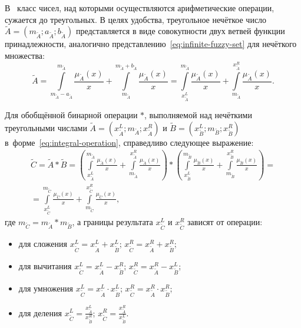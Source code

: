 В~\cite{Borisov_Krumberg_Riga} класс чисел, над которыми осуществляются арифметические операции, сужается до треугольных. В целях удобства, треугольное нечёткое число $\tilde{A}=\left( {{m}_{{\tilde{A}}}};{{a}_{{\tilde{A}}}};{{b}_{{\tilde{A}}}} \right)$ представляется в виде совокупности двух ветвей функции принадлежности, аналогично представлению~\eqref{eq:infinite-fuzzy-set} для нечёткого множества:
\begin{equation}
\label{eq:integral-operation}
	\tilde{A}=\int\limits_{{{m}_{{\tilde{A}}}}-{{a}_{{\tilde{A}}}}}^{{{m}_{{\tilde{A}}}}}{\frac{{{\mu }_{{\tilde{A}}}}\left( x \right)}{x}}+\int\limits_{{{m}_{{\tilde{A}}}}}^{{{m}_{{\tilde{A}}}}+{{b}_{{\tilde{A}}}}}{\frac{{{\mu }_{{\tilde{A}}}}\left( x \right)}{x}}=\int\limits_{x_{{\tilde{A}}}^{L}}^{{{m}_{{\tilde{A}}}}}{\frac{{{\mu }_{{\tilde{A}}}}\left( x \right)}{x}}+\int\limits_{{{m}_{{\tilde{A}}}}}^{x_{{\tilde{A}}}^{R}}{\frac{{{\mu }_{{\tilde{A}}}}\left( x \right)}{x}}.
\end{equation}

Для обобщённой бинарной операции $*$, выполняемой над нечёткими треугольными числами $\tilde{A}=\left( x_{{\tilde{A}}}^{L};{{m}_{{\tilde{A}}}};x_{{\tilde{A}}}^{R} \right)$ и $\tilde{B}=\left( x_{{\tilde{B}}}^{L};{{m}_{{\tilde{B}}}};x_{{\tilde{B}}}^{R} \right)$ в~форме~\eqref{eq:integral-operation}, справедливо следующее выражение:
\begin{gather*}
	\tilde{C}=\tilde{A}*\tilde{B}=\left( \int\limits_{x_{{\tilde{A}}}^{L}}^{{{m}_{{\tilde{A}}}}}{\frac{{{\mu }_{{\tilde{A}}}}\left( x \right)}{x}}+\int\limits_{{{m}_{{\tilde{A}}}}}^{x_{{\tilde{A}}}^{R}}{\frac{{{\mu }_{{\tilde{A}}}}\left( x \right)}{x}} \right)*\left( \int\limits_{x_{{\tilde{B}}}^{L}}^{{{m}_{{\tilde{B}}}}}{\frac{{{\mu }_{{\tilde{B}}}}\left( x \right)}{x}}+\int\limits_{{{m}_{{\tilde{B}}}}}^{x_{{\tilde{B}}}^{R}}{\frac{{{\mu }_{{\tilde{B}}}}\left( x \right)}{x}} \right)={}\\
	=\int\limits_{x_{{\tilde{C}}}^{L}}^{{{m}_{{\tilde{C}}}}}{\frac{{{\mu }_{{\tilde{C}}}}\left( x \right)}{x}}+\int\limits_{{{m}_{{\tilde{C}}}}}^{x_{{\tilde{C}}}^{R}}{\frac{{{\mu }_{{\tilde{C}}}}\left( x \right)}{x}},
\end{gather*}
где $m_{\tilde C}=m_{\tilde A}*m_{\tilde B}$, а границы результата $x_{\tilde C}^{L}$ и $x_{\tilde C}^{R}$ зависят от операции:
\begin{itemize}
	\item для сложения $x_{{\tilde{C}}}^{L}=x_{{\tilde{A}}}^{L}+x_{{\tilde{B}}}^{L}$; $x_{{\tilde{C}}}^{R}=x_{{\tilde{A}}}^{R}+x_{{\tilde{B}}}^{R}$;
	\item для вычитания $x_{{\tilde{C}}}^{L}=x_{{\tilde{A}}}^{L}-x_{{\tilde{B}}}^{R}$; $x_{{\tilde{C}}}^{R}=x_{{\tilde{A}}}^{R}-x_{{\tilde{B}}}^{L}$;
	\item для умножения $x_{{\tilde{C}}}^{L}=x_{{\tilde{A}}}^{L}\cdot x_{{\tilde{B}}}^{L}$; $x_{{\tilde{C}}}^{R}=x_{{\tilde{A}}}^{R}\cdot x_{{\tilde{B}}}^{R}$;
	\item для деления $\displaystyle x_{{\tilde{C}}}^{L}=\frac{x_{{\tilde{A}}}^{L}}{x_{{\tilde{B}}}^{R}}$; $\displaystyle x_{{\tilde{C}}}^{R}=\frac{x_{{\tilde{A}}}^{R}}{x_{{\tilde{B}}}^{L}}$.
\end{itemize}

